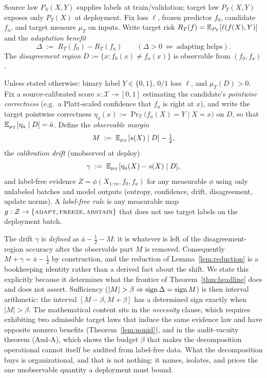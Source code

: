 
\noindent
Source law $P_S(X,Y)$ supplies labels at train/validation; target law $P_T(X,Y)$ exposes only
$P_T(X)$ at deployment. Fix loss $\ell$, frozen predictor $f_0$, candidate $f_a$, and target
measure $\mu_T$ on inputs. Write target risk $R_T(f)=\mathbb{E}_{P_T}[\ell(f(X),Y)]$ and the
\emph{adaptation benefit}
\[
\Delta \;:=\; R_T(f_0)-R_T(f_a)\qquad(\Delta>0\ \Leftrightarrow\ \text{adapting helps}).
\]
The \emph{disagreement region} $D:=\{x:f_0(x)\neq f_a(x)\}$ is observable from $(f_0,f_a)$.

\begin{assumption}\label{ass:deploy}
Unless stated otherwise: binary label $Y\in\{0,1\}$, $0/1$ loss $\ell$, and
$\mu_T(D)>0$. Fix a source-calibrated score $s:\mathcal{X}\to[0,1]$ estimating the candidate's
\emph{pointwise correctness} (e.g.\ a Platt-scaled confidence that $f_a$ is right at $x$), and write
the target pointwise correctness $\eta_a(x):=\Pr_T\!\bigl(f_a(X){=}Y\mid X{=}x\bigr)$ on $D$, so that
$\mathbb{E}_{\mu_T}[\eta_a\mid D]=\bar a$. Define the \emph{observable margin}
\[
M \;:=\; \mathbb{E}_{\mu_T}[s(X)\mid D]-\tfrac12,
\]
the \emph{calibration drift} (unobserved at deploy)
\[
\gamma \;:=\; \mathbb{E}_{\mu_T}[\eta_a(X)-s(X)\mid D],
\]
and label-free evidence $Z=\phi(X_{1:m},f_0,f_a)$ for any measurable
$\phi$ using only unlabeled batches and model outputs (entropy, confidence, drift,
disagreement, update norms). A \emph{label-free rule} is any measurable map
$g:\mathcal{Z}\to\{\textsc{adapt},\textsc{freeze},\textsc{abstain}\}$ that does not use target
labels on the deployment batch.
\end{assumption}

\begin{remark}[$\gamma$ is a residual, so $M+\gamma=\bar a-\tfrac12$ is an identity]\label{rem:gamma-residual}
The drift $\gamma$ is \emph{defined} as $\bar a-\tfrac12-M$: it is whatever is left of the
disagreement-region accuracy after the observable part $M$ is removed. Consequently
$M+\gamma=\bar a-\tfrac12$ by construction, and the reduction of Lemma~\ref{lem:reduction} is a
bookkeeping identity rather than a derived fact about the shift. We state this explicitly because it
determines what the frontier of Theorem~\ref{thm:headline} does and does not assert. Sufficiency
($|M|>\beta\Rightarrow\sign\Delta=\sign M$) is then interval arithmetic: the interval
$[M-\beta,M+\beta]$ has a determined sign exactly when $|M|>\beta$. The mathematical content sits in
the \emph{necessity} clause, which requires exhibiting two admissible target laws that induce the same
evidence law and have opposite nonzero benefits (Theorem~\ref{lem:nonid}), and in the
audit-vacuity theorem (Aud-A), which shows the budget $\beta$ that makes the decomposition operational
cannot itself be audited from label-free data. What the decomposition buys is organizational, and that
is not nothing: it names, isolates, and prices the one unobservable quantity a deployment must bound.
\end{remark}

